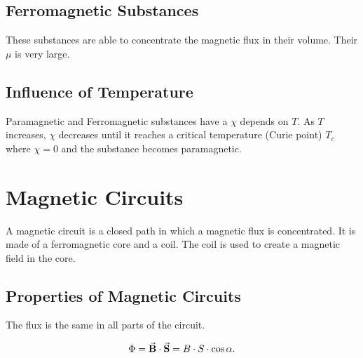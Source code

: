 \documentclass{report}
\begin{document}
\subsection{Ferromagnetic Substances}

These substances are able to concentrate the magnetic flux in their volume. Their $\mu$ is very large.

\subsection{Influence of Temperature}

Paramagnetic and Ferromagnetic substances have a $\chi$ depends on $T$. As $T$ increases, $\chi$ decreases until it reaches a critical temperature (Curie point) $T_c$ where $\chi = 0$ and the substance becomes paramagnetic.

\begin{figure}[H]
	\centering
\end{figure}


\section{Magnetic Circuits}

A magnetic circuit is a closed path in which a magnetic flux is concentrated. It is made of a ferromagnetic core and a coil. The coil is used to create a magnetic field in the core.

\subsection{Properties of Magnetic Circuits}

The flux is the same in all parts of the circuit.

\[
	\Phi = \va{B}\cdot\va{S} = B \cdot S \cdot \cos \alpha
	.\]
\end{document}
